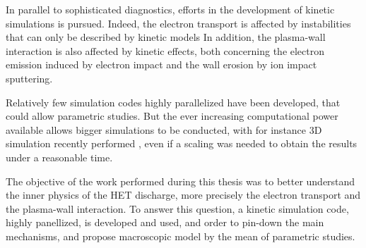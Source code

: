 In parallel to sophisticated diagnostics, efforts in the development of kinetic simulations is pursued.
Indeed, the electron transport is affected by instabilities that can only be described by kinetic models \citep{adam2008a,lafleur2016a}
In addition, the plasma-wall interaction is also affected by kinetic effects, both concerning the electron emission induced by electron impact \citep{barral2003a,raitses2011,sydorenko2006} and the wall erosion by ion impact sputtering.

Relatively few simulation codes highly parallelized have been developed, that could allow parametric studies.
But the ever increasing computational power available allows bigger simulations to be conducted, with for instance \ac{3D} simulation recently performed \citep{fubiani2018,taccogna2012}, even if a scaling was needed to obtain the results under a reasonable time.

The objective of the work performed during this thesis was to better understand the inner physics of the \ac{HET} discharge, more precisely the electron transport and the plasma-wall interaction. 
To answer this question, a kinetic simulation code, highly panellized, is developed and used, and order to pin-down the main mechanisms, and propose macroscopic model by the mean of parametric studies.
